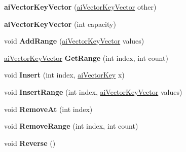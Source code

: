 \begin{DoxyCompactItemize}
\item 
\hypertarget{classai_vector_key_vector_a5dfe58c61854cd172ec6b47b12a40add}{{\bfseries ai\+Vector\+Key\+Vector} (\hyperlink{classai_vector_key_vector}{ai\+Vector\+Key\+Vector} other)}\label{classai_vector_key_vector_a5dfe58c61854cd172ec6b47b12a40add}

\item 
\hypertarget{classai_vector_key_vector_a957d8f68936029922e417738e210a1d5}{{\bfseries ai\+Vector\+Key\+Vector} (int capacity)}\label{classai_vector_key_vector_a957d8f68936029922e417738e210a1d5}

\item 
\hypertarget{classai_vector_key_vector_a95dae528e5bfbd76ad8e1062c6b8aeca}{void {\bfseries Add\+Range} (\hyperlink{classai_vector_key_vector}{ai\+Vector\+Key\+Vector} values)}\label{classai_vector_key_vector_a95dae528e5bfbd76ad8e1062c6b8aeca}

\item 
\hypertarget{classai_vector_key_vector_a372dffd0a4afa9cd4391d6137550d3a3}{\hyperlink{classai_vector_key_vector}{ai\+Vector\+Key\+Vector} {\bfseries Get\+Range} (int index, int count)}\label{classai_vector_key_vector_a372dffd0a4afa9cd4391d6137550d3a3}

\item 
\hypertarget{classai_vector_key_vector_a881f38cc3dc5bbc447f06e4887dffcec}{void {\bfseries Insert} (int index, \hyperlink{structai_vector_key}{ai\+Vector\+Key} x)}\label{classai_vector_key_vector_a881f38cc3dc5bbc447f06e4887dffcec}

\item 
\hypertarget{classai_vector_key_vector_ace9ed4cc71e15a4f6b97464101eb2245}{void {\bfseries Insert\+Range} (int index, \hyperlink{classai_vector_key_vector}{ai\+Vector\+Key\+Vector} values)}\label{classai_vector_key_vector_ace9ed4cc71e15a4f6b97464101eb2245}

\item 
\hypertarget{classai_vector_key_vector_a80bae9817d78f9dfeb2b9996b0c4613f}{void {\bfseries Remove\+At} (int index)}\label{classai_vector_key_vector_a80bae9817d78f9dfeb2b9996b0c4613f}

\item 
\hypertarget{classai_vector_key_vector_ae68f43a1238656844ed3a0bbd8398fa4}{void {\bfseries Remove\+Range} (int index, int count)}\label{classai_vector_key_vector_ae68f43a1238656844ed3a0bbd8398fa4}

\item 
\hypertarget{classai_vector_key_vector_a68173c96a25de7a90e37bfd6f4b8c78d}{void {\bfseries Reverse} ()}\label{classai_vector_key_vector_a68173c96a25de7a90e37bfd6f4b8c78d}


\end{DoxyCompactItemize}
